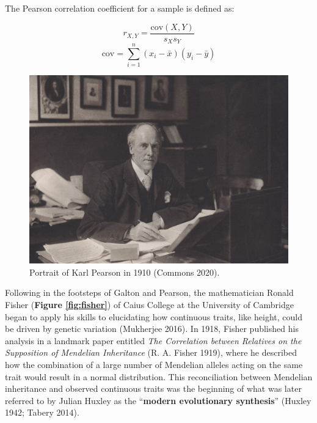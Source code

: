 \documentclass[
]{book}
\begin{document}
The Pearson correlation coefficient for a sample is defined as:

\begin{equation}
r_{X,Y} = \frac{\mathrm{cov}(X,Y)}{s_X s_Y} \label{eq:cor}
\end{equation}
\begin{equation}
\mathrm{cov} = \sum_{i=1} ^n (x_i - \bar{x})(y_i - \bar{y})
\end{equation}



\begin{figure}

\hfill{}\includegraphics[width=1\linewidth]{figs/introduction/Karl_Pearson_1910} 

\caption{Portrait of Karl Pearson in 1910 (Commons 2020).}\label{fig:pearson}
\end{figure}

Following in the footsteps of Galton and Pearson, the mathematician Ronald Fisher (\textbf{Figure \ref{fig:fisher}}) of Caius College at the University of Cambridge began to apply his skills to elucidating how continuous traits, like height, could be driven by genetic variation (Mukherjee 2016). In 1918, Fisher published his analysis in a landmark paper entitled \emph{The Correlation between Relatives on the Supposition of Mendelian Inheritance} (R. A. Fisher 1919), where he described how the combination of a large number of Mendelian alleles acting on the same trait would result in a normal distribution. This reconciliation between Mendelian inheritance and observed continuous traits was the beginning of what was later referred to by Julian Huxley as the ``\textbf{modern evolutionary synthesis}'' (Huxley 1942; Tabery 2014).
\end{document}
